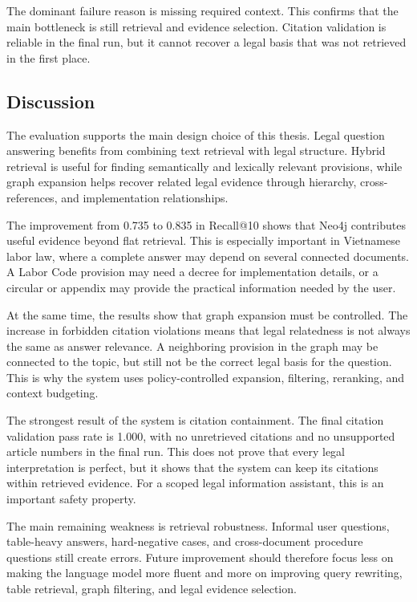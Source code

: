 The dominant failure reason is missing required context. This confirms that the main bottleneck is still retrieval and evidence selection. Citation validation is reliable in the final run, but it cannot recover a legal basis that was not retrieved in the first place.

\subsection{Discussion}

The evaluation supports the main design choice of this thesis. Legal question answering benefits from combining text retrieval with legal structure. Hybrid retrieval is useful for finding semantically and lexically relevant provisions, while graph expansion helps recover related legal evidence through hierarchy, cross-references, and implementation relationships.

The improvement from 0.735 to 0.835 in Recall@10 shows that Neo4j contributes useful evidence beyond flat retrieval. This is especially important in Vietnamese labor law, where a complete answer may depend on several connected documents. A Labor Code provision may need a decree for implementation details, or a circular or appendix may provide the practical information needed by the user.

At the same time, the results show that graph expansion must be controlled. The increase in forbidden citation violations means that legal relatedness is not always the same as answer relevance. A neighboring provision in the graph may be connected to the topic, but still not be the correct legal basis for the question. This is why the system uses policy-controlled expansion, filtering, reranking, and context budgeting.

The strongest result of the system is citation containment. The final citation validation pass rate is 1.000, with no unretrieved citations and no unsupported article numbers in the final run. This does not prove that every legal interpretation is perfect, but it shows that the system can keep its citations within retrieved evidence. For a scoped legal information assistant, this is an important safety property.

The main remaining weakness is retrieval robustness. Informal user questions, table-heavy answers, hard-negative cases, and cross-document procedure questions still create errors. Future improvement should therefore focus less on making the language model more fluent and more on improving query rewriting, table retrieval, graph filtering, and legal evidence selection.

